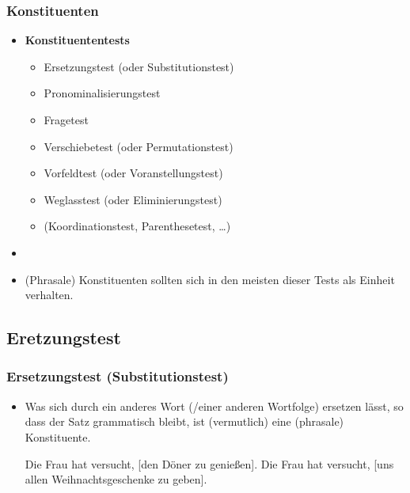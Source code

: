 \begin{frame}
\frametitle{Konstituenten}

\begin{itemize}

	\item \textbf{Konstituententests} \citep[vgl.][4ff.]{MuellerS13f}
	\begin{itemize}
		\item Ersetzungstest (oder Substitutionstest)
		\item Pronominalisierungstest
		\item Fragetest
		\item Verschiebetest (oder Permutationstest)
		\item Vorfeldtest (oder Voranstellungstest) 
		\item Weglasstest (oder Eliminierungstest)
		\item (Koordinationstest, Parenthesetest, \dots )
	\end{itemize}
	\item[]
	\item (Phrasale) Konstituenten sollten sich in den meisten dieser Tests als Einheit verhalten.

\end{itemize}

\end{frame}


\subsection{Eretzungstest}

\begin{frame}
\frametitle{Ersetzungstest (Substitutionstest)}

\begin{itemize}
	\item Was sich durch ein anderes Wort (/einer anderen Wortfolge) ersetzen lässt, so dass der Satz grammatisch bleibt, ist (vermutlich) eine (phrasale) Konstituente.

	\eal 
	\zl

\pause	
	\eal 
	\ex Die Frau hat versucht, \alert{[den Döner zu genießen]}.
	\ex Die Frau hat versucht, \alert{[uns allen Weihnachtsgeschenke zu geben]}.
	\zl
	
\end{itemize}

\end{frame}


